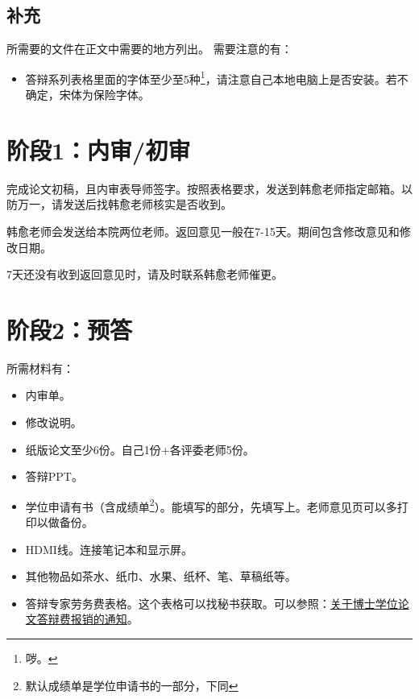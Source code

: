 \documentclass[12pt,a4paper]{ctexart}
\begin{document}
 \subsection{补充}
\label{sec:auc}




所需要的文件在正文中需要的地方列出。
需要注意的有：
\begin{itemize}
\item 答辩系列表格里面的字体至少至5种\footnote{哕。}，请注意自己本地电脑上是否安装。若不确定，宋体为保险字体。
\end{itemize}

\section{阶段1：内审/初审}
\label{sec:rev1}
完成论文初稿，且内审表导师签字。按照表格要求，发送到韩愈老师指定邮箱。以防万一，请发送后找韩愈老师核实是否收到。

韩愈老师会发送给本院两位老师。返回意见一般在7-15天。期间包含修改意见和修改日期。

7天还没有收到返回意见时，请及时联系韩愈老师催更。

\section{阶段2：预答}
\label{sec:prepre}

所需材料有：
\begin{itemize}[label=〇]
\item 内审单。
\item 修改说明。
\item 纸版论文至少6份。自己1份+各评委老师5份。
\item 答辩PPT。
\item 学位申请有书（含成绩单\footnote{默认成绩单是学位申请书的一部分，下同}）。能填写的部分，先填写上。老师意见页可以多打印以做备份。
\item HDMI线。连接笔记本和显示屏。
\item 其他物品如茶水、纸巾、水果、纸杯、笔、草稿纸等。
  \item 答辩专家劳务费表格。这个表格可以找秘书获取。可以参照：\href{https://gs.dlut.edu.cn/info/1211/8758.htm}{关于博士学位论文答辩费报销的通知}。
\end{itemize}
\end{document}
